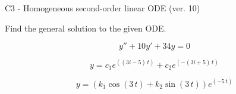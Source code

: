 \begin{exercise}
  \begin{exerciseTitle}C3 - Homogeneous second-order linear ODE (ver. 10)\end{exerciseTitle}
  \begin{exerciseStatement}
    
Find the general solution to the given ODE.

    
\[y''+10y'+34y = 0\]

  \end{exerciseStatement}
  \begin{exerciseAnswer}
    
\[y= c_{1} e^{\left(\left(3 i - 5\right) \, t\right)} + c_{2} e^{\left(-\left(3 i + 5\right) \, t\right)}\]

    
\[y= {\left(k_{1} \cos\left(3 \, t\right) + k_{2} \sin\left(3 \, t\right)\right)} e^{\left(-5 \, t\right)}\]

  \end{exerciseAnswer}
\end{exercise}